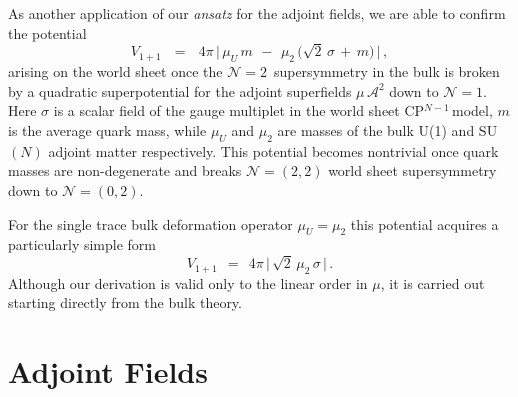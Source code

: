 \documentclass[12pt]{article}
\def\beq{\begin{equation}}
\def\eeq{\end{equation}}
\newcommand{\ntwon}{${\mathcal N}=2$}
\newcommand{\ntwot}{${\mathcal N}= \left(2,2\right) $ }
\newcommand{\ntwoon}{${\mathcal N}= \left(0,2\right)$}
\newcommand{\ca}{{\mathcal A}}
\newcommand{\cpn}{CP$^{N-1}$\,}
\newcommand{\ansatz}{{\it ansatz} }
\begin{document}
	As another application of our \ansatz for the adjoint fields, we are able to confirm the potential 
\beq
\label{Vmu}
	V_{1+1}    \:~~ = ~~\:
	4\pi\, \Big|\, \mu_U\, m  \,~-~\,  \mu_2\, \big( \sqrt{2}\,\sigma \,+\, m \big) \,\Big|\,,
\eeq
	arising on the world sheet \cite{Shifman:2010kr} 
	once the \ntwon\, supersymmetry in the bulk is broken by a quadratic superpotential for the
	adjoint superfields $ \mu\, \ca^2 $ down to ${\mathcal N}=1$.
	Here $\sigma$ is a scalar field of the gauge multiplet in the world sheet \cpn model, $m$ is the average quark mass,
	while $\mu_U$ and $\mu_2$ are masses of the bulk U(1) and SU$(N)$ adjoint matter respectively. 
	This potential becomes nontrivial once quark masses are non-degenerate and breaks \ntwot world sheet supersymmetry down to 
	\ntwoon. 
	
	For the single trace bulk deformation operator $\mu_U=\mu_2$ this 
	potential acquires a particularly simple form
	\beq
\label{Vmu1}
	V_{1+1}   ~~=~~
	4 \pi\, \Big|\,  \sqrt{2}\, \mu_2\, \sigma  \,\Big|\,.
\eeq
	Although our derivation is valid only to the linear order in $ \mu $, it is carried out
	starting directly from the bulk theory.




\section{Adjoint Fields}
\setcounter{equation}{0}
\end{document}
